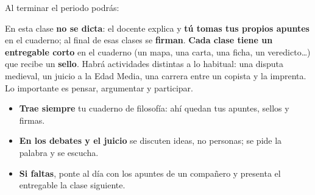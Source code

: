 \documentclass[programa]{planeacion}
\begin{document}
\fichaprograma


Al terminar el periodo podrás:
\begin{aprendizajes}
\end{aprendizajes}

En esta clase \textbf{no se dicta}: el docente explica y \textbf{tú tomas tus propios apuntes} en el
cuaderno; al final de esas clases se \textbf{firman}. \textbf{Cada clase tiene un entregable corto} en
el cuaderno (un mapa, una carta, una ficha, un veredicto…) que recibe un \textbf{sello}. Habrá
actividades distintas a lo habitual: una disputa medieval, un juicio a la Edad Media, una carrera
entre un copista y la imprenta. Lo importante es pensar, argumentar y participar.
\begin{itemize}\setlength{\itemsep}{1pt}
  \item \textbf{Trae siempre} tu cuaderno de filosofía: ahí quedan tus apuntes, sellos y firmas.
  \item \textbf{En los debates y el juicio} se discuten ideas, no personas; se pide la palabra y se escucha.
  \item \textbf{Si faltas}, ponte al día con los apuntes de un compañero y presenta el entregable la
    clase siguiente.
\end{itemize}
\end{document}
